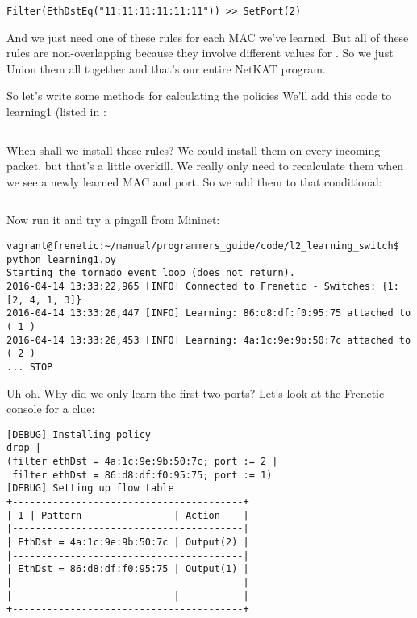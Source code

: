 \begin{verbatim}
Filter(EthDstEq("11:11:11:11:11:11")) >> SetPort(2)
\end{verbatim}

And we just need one of these rules for each MAC we've learned.  But all of these rules are non-overlapping
because they involve different values for .  So we just Union them all together and that's
our entire NetKAT program.

So let's write some methods for calculating the policies
We'll add this code to learning1 (listed in :

\inputminted[firstline=23,lastline=31]{python}{code/l2_learning_switch/learning2.py}

When shall we install these rules?   We could install them on every incoming packet, but that's a little
overkill. We really only need to recalculate them when we see a newly learned MAC and port.  So we add them
to that conditional:

\inputminted[firstline=42,lastline=44]{python}{code/l2_learning_switch/learning2.py}

Now run it and try a pingall from Mininet:

\begin{verbatim}
vagrant@frenetic:~/manual/programmers_guide/code/l2_learning_switch$ python learning1.py
Starting the tornado event loop (does not return).
2016-04-14 13:33:22,965 [INFO] Connected to Frenetic - Switches: {1: [2, 4, 1, 3]}
2016-04-14 13:33:26,447 [INFO] Learning: 86:d8:df:f0:95:75 attached to ( 1 )
2016-04-14 13:33:26,453 [INFO] Learning: 4a:1c:9e:9b:50:7c attached to ( 2 )
... STOP
\end{verbatim}

Uh oh.  Why did we only learn the first two ports?   Let's look at the Frenetic console for a clue:

\begin{verbatim}
[DEBUG] Installing policy
drop |
(filter ethDst = 4a:1c:9e:9b:50:7c; port := 2 |
 filter ethDst = 86:d8:df:f0:95:75; port := 1)
[DEBUG] Setting up flow table
+----------------------------------------+
| 1 | Pattern                | Action    |
|----------------------------------------|
| EthDst = 4a:1c:9e:9b:50:7c | Output(2) |
|----------------------------------------|
| EthDst = 86:d8:df:f0:95:75 | Output(1) |
|----------------------------------------|
|                            |           |
+----------------------------------------+
\end{verbatim}

